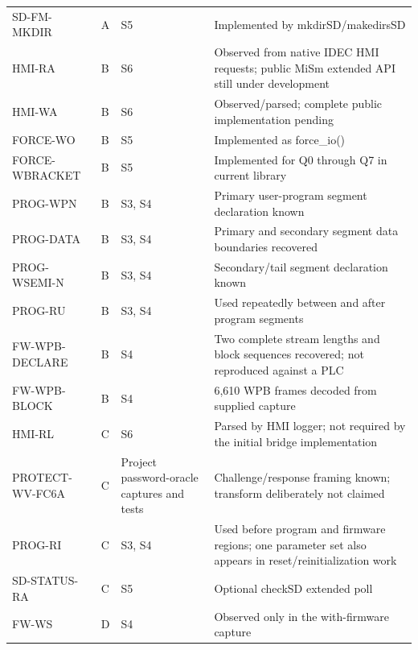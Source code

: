 \documentclass[10pt,letterpaper]{article}
\begin{document}
\begin{longtable}{@{}p{3.5cm}p{1.2cm}p{3.2cm}p{8.0cm}@{}}
SD-FM-MKDIR & A & S5 & Implemented by mkdirSD/makedirsSD \\

HMI-RA & B & S6 & Observed from native IDEC HMI requests; public MiSm extended API still under development \\

HMI-WA & B & S6 & Observed/parsed; complete public implementation pending \\

FORCE-WO & B & S5 & Implemented as force\_io() \\

FORCE-WBRACKET & B & S5 & Implemented for Q0 through Q7 in current library \\

PROG-WPN & B & S3, S4 & Primary user-program segment declaration known \\

PROG-DATA & B & S3, S4 & Primary and secondary segment data boundaries recovered \\

PROG-WSEMI-N & B & S3, S4 & Secondary/tail segment declaration known \\

PROG-RU & B & S3, S4 & Used repeatedly between and after program segments \\

FW-WPB-DECLARE & B & S4 & Two complete stream lengths and block sequences recovered; not reproduced against a PLC \\

FW-WPB-BLOCK & B & S4 & 6,610 WPB frames decoded from supplied capture \\

HMI-RL & C & S6 & Parsed by HMI logger; not required by the initial bridge implementation \\

PROTECT-WV-FC6A & C & Project password-oracle captures and tests & Challenge/response framing known; transform deliberately not claimed \\

PROG-RI & C & S3, S4 & Used before program and firmware regions; one parameter set also appears in reset/reinitialization work \\

SD-STATUS-RA & C & S5 & Optional checkSD extended poll \\

FW-WS & D & S4 & Observed only in the with-firmware capture \\


\bottomrule
\end{longtable}
\end{document}
